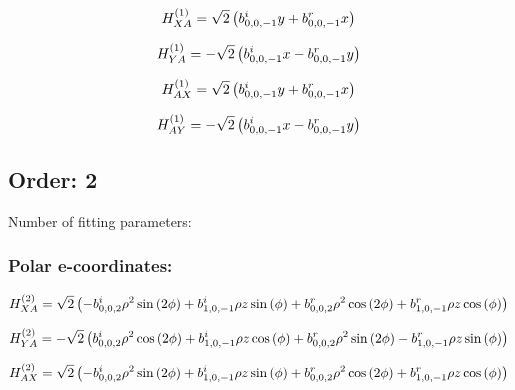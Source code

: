 \documentclass[fleqn]{article}
\begin{document}
\begin{dmath*}
H_{XA}^{(1)}=\sqrt{2} \left(b^{i}_{0,0,-1} y + b^{r}_{0,0,-1} x\right)\\
\end{dmath*}

\begin{dmath*}
H_{YA}^{(1)}=-  \sqrt{2} \left( b^{i}_{0,0,-1} x -  b^{r}_{0,0,-1} y\right)\\
\end{dmath*}

\begin{dmath*}
H_{AX}^{(1)}=\sqrt{2} \left(b^{i}_{0,0,-1} y + b^{r}_{0,0,-1} x\right)\\
\end{dmath*}

\begin{dmath*}
H_{AY}^{(1)}=-  \sqrt{2} \left( b^{i}_{0,0,-1} x -  b^{r}_{0,0,-1} y\right)\\
\end{dmath*}
\subsection{Order: 2}
Number of fitting parameters: 
\subsubsection*{Polar e-coordinates:}

\begin{dmath*}
H_{XA}^{(2)}=\sqrt{2} \left(- b^{i}_{0,0,2} \rho^{2} \sin{\left (2 \phi \right )} + b^{i}_{1,0,-1} \rho z \sin{\left (\phi \right )} + b^{r}_{0,0,2} \rho^{2} \cos{\left (2 \phi \right )} + b^{r}_{1,0,-1} \rho z \cos{\left (\phi \right )}\right)\\
\end{dmath*}

\begin{dmath*}
H_{YA}^{(2)}=-  \sqrt{2} \left( b^{i}_{0,0,2} \rho^{2} \cos{\left (2 \phi \right )} +  b^{i}_{1,0,-1} \rho z \cos{\left (\phi \right )} +  b^{r}_{0,0,2} \rho^{2} \sin{\left (2 \phi \right )} -  b^{r}_{1,0,-1} \rho z \sin{\left (\phi \right )}\right)\\
\end{dmath*}

\begin{dmath*}
H_{AX}^{(2)}=\sqrt{2} \left(- b^{i}_{0,0,2} \rho^{2} \sin{\left (2 \phi \right )} + b^{i}_{1,0,-1} \rho z \sin{\left (\phi \right )} + b^{r}_{0,0,2} \rho^{2} \cos{\left (2 \phi \right )} + b^{r}_{1,0,-1} \rho z \cos{\left (\phi \right )}\right)\\
\end{dmath*}
\end{document}
